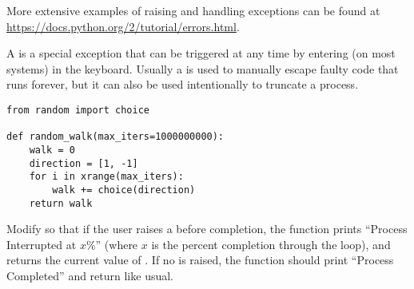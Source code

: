 \begin{comment} %
An exception that is caught by an \li{except} statement can be captured as a variable within the \li{except} block if it is declared using the keyword \li{as}.

\begin{lstlisting}
# Catch only a specific class of exceptions.
>>> try:
...     bad = 100 / 0
... except ZeroDivisionError as e:
...     print(e)
... 
<<integer division or modulo by zero>>

# Here a different exception is raised than the one in the except statement.
>>> try:
...     1 + 'a' + 2 + 'b' + 3
... except ValueError as e:
...     print(e)
<<Traceback (most recent call last):
  File "<stdin>", line 2, in <module>
TypeError: unsupported operand type(s) for +: 'int' and 'str'>>

>>> try:
...     import magic
... except ImportError as e:
...     print "Sorry!", e
... 
Sorry! No module named magic
\end{lstlisting}

Multiple kinds of exceptions can be caught by a single \li{except} statement using a parenthesized list of exceptions.
There can also be more than one \li{except} statements corresponding to a single \li{try} statement, each indicating which exception class(es) to catch.
An \li{else} statement can also be attached after \li{except} statements, which is only executed if the \li{try} block is executed to completion.
\end{comment}

More extensive examples of raising and handling exceptions can be found at \url{https://docs.python.org/2/tutorial/errors.html}.

\begin{problem}
A  is a special exception that can be triggered at any time by entering  (on most systems) in the keyboard.
Usually a  is used to manually escape faulty code that runs forever, but it can also be used intentionally to truncate a process.

\begin{lstlisting}
from random import choice

def random_walk(max_iters=1000000000):
    walk = 0
    direction = [1, -1]
    for i in xrange(max_iters):
        walk += choice(direction)
    return walk
\end{lstlisting}
Modify  so that if the user raises a  before completion, the function prints ``Process Interrupted at $x$\%'' (where $x$ is the percent completion through the loop), and returns the current value of .
If no  is raised, the function should print ``Process Completed'' and return  like usual.
\end{problem}

